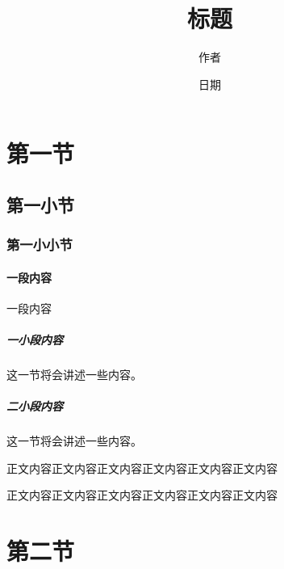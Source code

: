 \documentclass[a4paper,12pt]{article}
\begin{document}
\begin{CJK}{UTF8}{song}
\title{标题}
\author{作者}
\date{日期}
\maketitle

\tableofcontents    %

\section{第一节}
\subsection{第一小节}
\subsubsection{第一小小节}
\paragraph{一段内容} 一段内容
\subparagraph{一小段内容} 这一节将会讲述一些内容。
\subparagraph{二小段内容} 这一节将会讲述一些内容。

正文内容正文内容正文内容正文内容正文内容正文内容

正文内容正文内容正文内容正文内容正文内容正文内容
\section{第二节}

%

\end{CJK}
\end{document}
